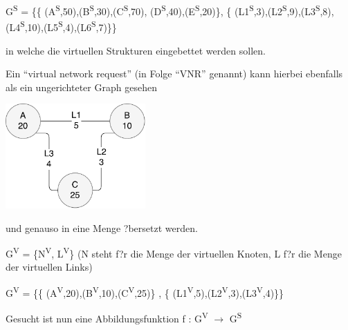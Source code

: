 \documentclass{lni}
\begin{document}
\begin{center}
G\textsuperscript{S} = 
\{\{
(A\textsuperscript{S},50),(B\textsuperscript{S},30),(C\textsuperscript{S},70),
(D\textsuperscript{S},40),(E\textsuperscript{S},20)\},
\newline\{
(L1\textsuperscript{S},3),(L2\textsuperscript{S},9),(L3\textsuperscript{S},8),
(L4\textsuperscript{S},10),(L5\textsuperscript{S},4),(L6\textsuperscript{S},7)\}\}
\end{center}
in welche die virtuellen Strukturen eingebettet werden sollen.

Ein "`virtual network request"' (in Folge "`VNR"' genannt) kann hierbei ebenfalls als ein ungerichteter Graph gesehen
\begin{center}
	\includegraphics[width=0.4\textwidth]{VNR1.pdf}\newline
\end{center}
und genauso in eine Menge ?bersetzt werden.\newline
\begin{center}
G\textsuperscript{V} = \{N\textsuperscript{V}, L\textsuperscript{V}\}\newline
(N steht f?r die Menge der virtuellen Knoten, L f?r die Menge der virtuellen Links)
\end{center}

\begin{center}
G\textsuperscript{V} = \{\{
(A\textsuperscript{V},20),(B\textsuperscript{V},10),(C\textsuperscript{V},25)\} , \{
(L1\textsuperscript{V},5),(L2\textsuperscript{V},3),(L3\textsuperscript{V},4)\}\}
\end{center}

\begin{center}
Gesucht ist nun eine Abbildungsfunktion f : G\textsuperscript{V} $\rightarrow$ G\textsuperscript{S}
\end{center}
\end{document}
